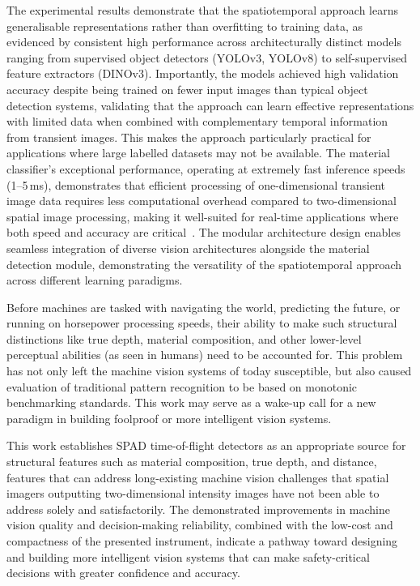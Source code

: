 \documentclass[12pt,a4paper,oneside]{report}
\begin{document}
The experimental results demonstrate that the spatiotemporal approach learns generalisable representations rather than overfitting to training data, as evidenced by consistent high performance across architecturally distinct models ranging from supervised object detectors (YOLOv3, YOLOv8) to self-supervised feature extractors (DINOv3). Importantly, the models achieved high validation accuracy despite being trained on fewer input images than typical object detection systems, validating that the approach can learn effective representations with limited data when combined with complementary temporal information from transient images. This makes the approach particularly practical for applications where large labelled datasets may not be available. The material classifier's exceptional performance, operating at extremely fast inference speeds (1--5\,ms), demonstrates that efficient processing of one-dimensional transient image data requires less computational overhead compared to two-dimensional spatial image processing, making it well-suited for real-time applications where both speed and accuracy are critical~\cite{gyongy2021}. The modular architecture design enables seamless integration of diverse vision architectures alongside the material detection module, demonstrating the versatility of the spatiotemporal approach across different learning paradigms.

Before machines are tasked with navigating the world, predicting the future, or running on horsepower processing speeds, their ability to make such structural distinctions like true depth, material composition, and other lower-level perceptual abilities (as seen in humans) need to be accounted for. This problem has not only left the machine vision systems of today susceptible, but also caused evaluation of traditional pattern recognition to be based on monotonic benchmarking standards. This work may serve as a wake-up call for a new paradigm in building foolproof or more intelligent vision systems.

This work establishes SPAD time-of-flight detectors as an appropriate source for structural features such as material composition, true depth, and distance, features that can address long-existing machine vision challenges that spatial imagers outputting two-dimensional intensity images have not been able to address solely and satisfactorily. The demonstrated improvements in machine vision quality and decision-making reliability, combined with the low-cost and compactness of the presented instrument, indicate a pathway toward designing and building more intelligent vision systems that can make safety-critical decisions with greater confidence and accuracy.
\end{document}
